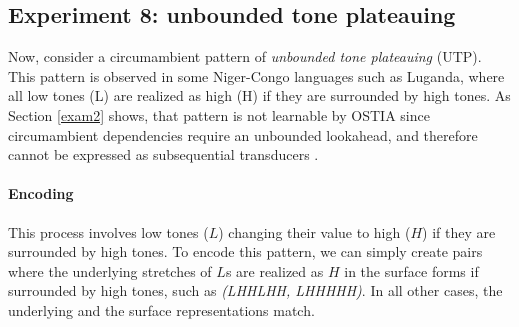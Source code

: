\begin{table}[h!]
\centering
{}
\caption{Results of OSTIA learning vowel and consonant harmonies with blocking.}
\end{table}



\subsection{Experiment 8: unbounded tone plateauing}

Now, consider a circumambient pattern of \emph{unbounded tone plateauing} (UTP).
This pattern is observed in some Niger-Congo languages such as Luganda, where all low tones (L) are realized as high (H) if they are surrounded by high tones.
As Section \ref{exam2} shows, that pattern is not learnable by OSTIA since circumambient dependencies require an unbounded lookahead, and therefore cannot be expressed as subsequential transducers \citep{Jardine2016}.

\paragraph{Encoding}
This process involves low tones ($L$) changing their value to high ($H$) if they are surrounded by high tones.
To encode this pattern, we can simply create pairs where the underlying stretches of $L$s are realized as $H$ in the surface forms if surrounded by high tones, such as \emph{(LHHLHH, LHHHHH)}.
In all other cases, the underlying and the surface representations match.

